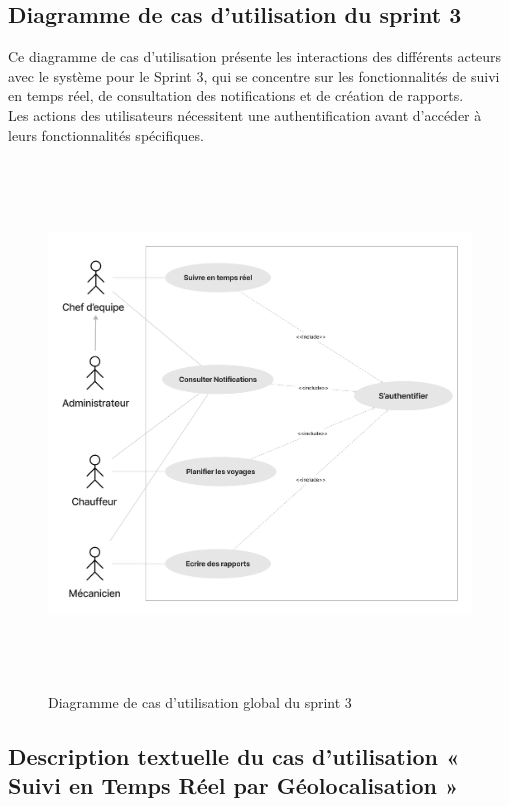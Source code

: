 \subsection{Diagramme de cas d’utilisation du sprint 3}

Ce diagramme de cas d'utilisation présente les interactions des différents acteurs avec le système pour le Sprint 3, qui se concentre sur les fonctionnalités de suivi en temps réel, de consultation des notifications et de création de rapports. \\
Les actions des utilisateurs nécessitent une authentification avant d'accéder à leurs fonctionnalités spécifiques.

\begin{figure}[h!]
    \centering
    \includegraphics[width=1\textwidth,height=14cm]{chap5.images/dcu global sprint 3.png}
    \caption{Diagramme de cas d’utilisation global du sprint 3}

\end{figure}


\newpage
\subsection{Description textuelle du cas d’utilisation « Suivi en Temps Réel par Géolocalisation »}


